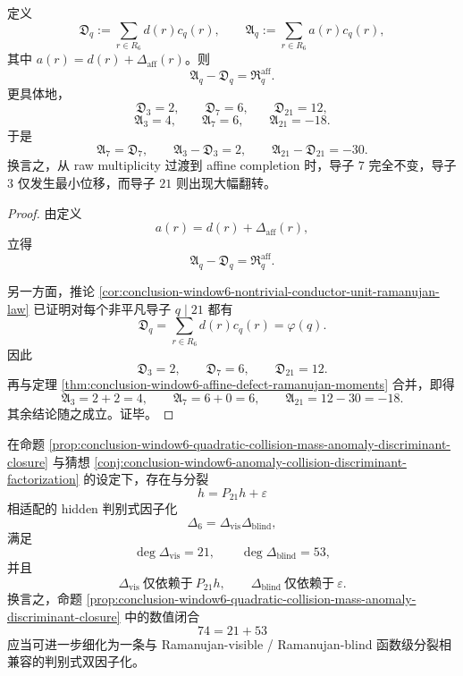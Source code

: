 \begin{corollary}\label{cor:conclusion-window6-raw-affine-conductor-shift}
定义
\[
\mathfrak D_q:=\sum_{r\in R_6}d(r)c_q(r),
\qquad
\mathfrak A_q:=\sum_{r\in R_6}a(r)c_q(r),
\]
其中 \(a(r)=d(r)+\Delta_{\mathrm{aff}}(r)\)。则
\[
\mathfrak A_q-\mathfrak D_q=\mathfrak R_q^{\mathrm{aff}}.
\]
更具体地，
\[
\mathfrak D_3=2,\qquad
\mathfrak D_7=6,\qquad
\mathfrak D_{21}=12,
\]
\[
\mathfrak A_3=4,\qquad
\mathfrak A_7=6,\qquad
\mathfrak A_{21}=-18.
\]
于是
\[
\mathfrak A_7=\mathfrak D_7,
\qquad
\mathfrak A_3-\mathfrak D_3=2,
\qquad
\mathfrak A_{21}-\mathfrak D_{21}=-30.
\]
换言之，从 raw multiplicity 过渡到 affine completion 时，导子 \(7\) 完全不变，导子 \(3\) 仅发生最小位移，而导子 \(21\) 则出现大幅翻转。
\end{corollary}
\begin{proof}
由定义
\[
a(r)=d(r)+\Delta_{\mathrm{aff}}(r),
\]
立得
\[
\mathfrak A_q-\mathfrak D_q=\mathfrak R_q^{\mathrm{aff}}.
\]

另一方面，推论 \ref{cor:conclusion-window6-nontrivial-conductor-unit-ramanujan-law} 已证明对每个非平凡导子 \(q\mid 21\) 都有
\[
\mathfrak D_q=\sum_{r\in R_6}d(r)c_q(r)=\varphi(q).
\]
因此
\[
\mathfrak D_3=2,\qquad
\mathfrak D_7=6,\qquad
\mathfrak D_{21}=12.
\]
再与定理 \ref{thm:conclusion-window6-affine-defect-ramanujan-moments} 合并，即得
\[
\mathfrak A_3=2+2=4,
\qquad
\mathfrak A_7=6+0=6,
\qquad
\mathfrak A_{21}=12-30=-18.
\]
其余结论随之成立。证毕。
\end{proof}

\begin{conjecture}\label{conj:conclusion-window6-ramanujan-visible-blind-discriminant-refinement}
在命题 \ref{prop:conclusion-window6-quadratic-collision-mass-anomaly-discriminant-closure} 与猜想 \ref{conj:conclusion-window6-anomaly-collision-discriminant-factorization} 的设定下，存在与分裂
\[
h=P_{21}h+\varepsilon
\]
相适配的 hidden 判别式因子化
\[
\Delta_6=\Delta_{\mathrm{vis}}\Delta_{\mathrm{blind}},
\]
满足
\[
\deg\Delta_{\mathrm{vis}}=21,
\qquad
\deg\Delta_{\mathrm{blind}}=53,
\]
并且
\[
\Delta_{\mathrm{vis}}\ \text{仅依赖于}\ P_{21}h,
\qquad
\Delta_{\mathrm{blind}}\ \text{仅依赖于}\ \varepsilon.
\]
换言之，命题 \ref{prop:conclusion-window6-quadratic-collision-mass-anomaly-discriminant-closure} 中的数值闭合
\[
74=21+53
\]
应当可进一步细化为一条与 Ramanujan-visible / Ramanujan-blind 函数级分裂相兼容的判别式双因子化。
\end{conjecture}
